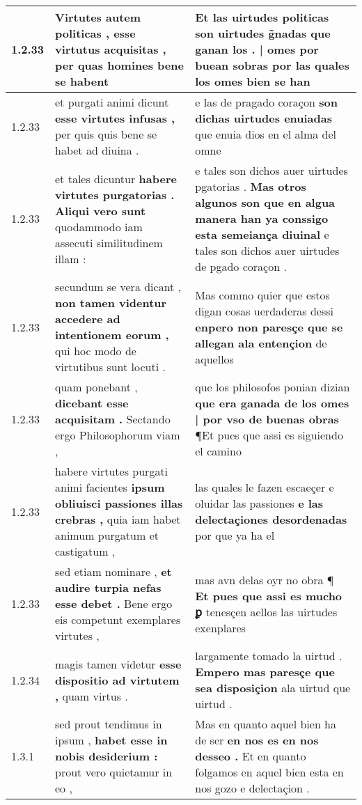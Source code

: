 \begin{tabular}{|p{1cm}|p{6.5cm}|p{6.5cm}|}
1.2.33 & Virtutes autem politicas , \textbf{ esse virtutus acquisitas , } per quas homines bene se habent & Et las uirtudes politicas son uirtudes g̃nadas \textbf{ que ganan los . | omes por buean sobras } por las quales los omes bien se han \\\hline
1.2.33 & et purgati animi dicunt \textbf{ esse virtutes infusas , } per quis quis bene se habet ad diuina . & e las de pragado coraçon \textbf{ son dichas uirtudes enuiadas } que enuia dios en el alma del omne \\\hline
1.2.33 & et tales dicuntur \textbf{ habere virtutes purgatorias . Aliqui vero sunt } quodammodo iam assecuti similitudinem illam : & e tales son dichos auer uirtudes pgatorias . \textbf{ Mas otros algunos son que en algua manera han ya conssigo esta semeiança diuinal } e tales son dichos auer uirtudes de pgado coraçon . \\\hline
1.2.33 & secundum se vera dicant , \textbf{ non tamen videntur accedere ad intentionem eorum , } qui hoc modo de virtutibus sunt locuti . & Mas commo quier que estos digan cosas uerdaderas dessi \textbf{ enpero non paresçe que se allegan ala entençion } de aquellos \\\hline
1.2.33 & quam ponebant , \textbf{ dicebant esse acquisitam . } Sectando ergo Philosophorum viam , & que los philosofos ponian dizian \textbf{ que era ganada de los omes | por vso de buenas obras } ¶Et pues que assi es siguiendo el camino \\\hline
1.2.33 & habere virtutes purgati animi facientes \textbf{ ipsum obliuisci passiones illas crebras , } quia iam habet animum purgatum et castigatum , & las quales le fazen escaeçer e oluidar las passiones \textbf{ e las delectaçiones desordenadas } por que ya ha el \\\hline
1.2.33 & sed etiam nominare , \textbf{ et audire turpia nefas esse debet . } Bene ergo eis competunt exemplares virtutes , & mas avn delas oyr no obra ¶ \textbf{ Et pues que assi es mucho ꝑ } tenesçen aellos las uirtudes exenplares \\\hline
1.2.34 & magis tamen videtur \textbf{ esse dispositio ad virtutem , } quam virtus . & largamente tomado la uirtud . \textbf{ Empero mas paresçe que sea disposiçion } ala uirtud que uirtud . \\\hline
1.3.1 & sed prout tendimus in ipsum , \textbf{ habet esse in nobis desiderium : } prout vero quietamur in eo , & Mas en quanto aquel bien ha de ser \textbf{ en nos es en nos desseo . } Et en quanto folgamos en aquel bien esta en nos gozo e delectaçion . \\\hline

\end{tabular}
